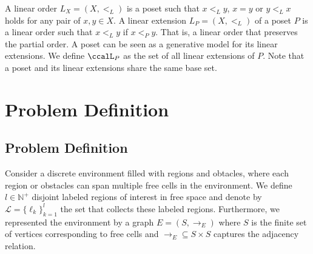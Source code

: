 \documentclass[journal]{IEEEtran}
\begin{document}
A linear order $L_X=(X, <_L)$ is a poset such that $x <_L y$, $x = y$ or $y <_L x$ holds for any pair of  $x, y \in X$. A linear extension  $L_P = (X, <_L)$ of a poset $P$ is a linear order such that $x <_L y$ if $x <_P y$. That is, a linear order that preserves the partial order. A poset can be seen as a generative model for its linear extensions.
We define $\ccalL_P$ as the set of all linear extensions of $P$. Note that a poset and its linear extensions share the same base set. 

\section{Problem Definition}\label{sec:problem}
 \subsection{Problem Definition}

 Consider a discrete environment filled with regions and obtacles, where each region or obstacles can span multiple free cells in the environment. We define $l\in \mathbb{N}^+$ disjoint labeled regions of interest in free space and denote by $\mathcal{L}=\{\ell_k\}_{k=1}^{l}$ the set that collects these labeled regions. Furthermore, we represented the environment by a graph $E = (S, \to_E)$ where $S$ is the finite set of vertices corresponding to free cells and $\to_{E} \subseteq S \times S$ captures the adjacency relation.
\end{document}
